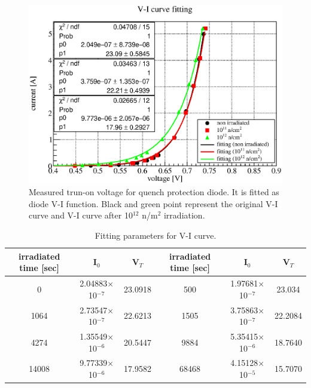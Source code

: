   \begin{figure}[H]
    \centering
    \includegraphics[scale=0.45]{chapter4/fig/diodefit.eps}
   \caption{Measured trun-on voltage for quench protection diode. It is fitted as diode V-I function. Black and green point represent the original V-I curve and V-I curve after 10$^{12}$ n/m$^2$ irradiation.}
   \label{3fitdiode}
  \end{figure}
 
\begin{table}[H]
 \centering
 \begin{tabular}{cccccc} \hline \hline
  irradiated time [sec] & I$_0$ & V$_T$ & irradiated time [sec] & I$_0$ & V$_T$ \\ \hline
  0 & 2.04883$\times$10$^{-7}$ & 23.0918 & 500 & 1.97681$\times$10$^{-7}$ & 23.034 \\
  1064 & 2.73547$\times$10$^{-7}$ & 22.6213 & 1505 & 3.75863$\times$10$^{-7}$ & 22.2084 \\
  4274 & 1.35549$\times$10$^{-6}$ & 20.5447 & 9884 & 5.35415$\times$10$^{-6}$ & 18.7640 \\
  14008 & 9.77339$\times$10$^{-6}$ & 17.9582 & 68468 & 4.15128$\times$10$^{-5}$ & 15.7070 \\ \hline \hline
 \end{tabular}
 \caption{Fitting parameters for V-I curve.}
 \label{fit3}
\end{table}

